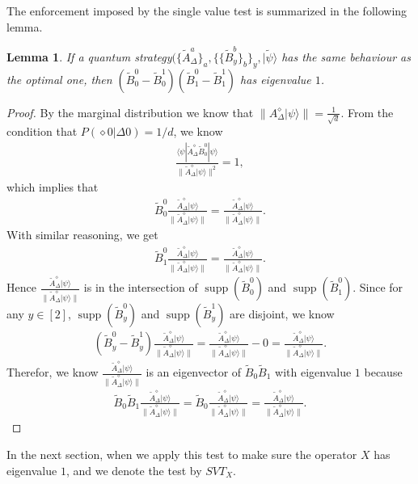 \documentclass[11pt,letterpaper]{article}
\newcommand{\ket}[1]{|#1\rangle}
\newcommand{\bra}[1]{\langle#1|}
\DeclareMathOperator{\supp}{supp}
\newcommand{\tri}{\Delta}
\newcommand{\1}{\mathbb{1}}
\newcommand{\SVT}{SVT}
\newcommand{\tA}{\tilde{A}}
\newcommand{\tB}{\tilde{B}}
\newcommand{\tpsi}{\tilde{\psi}}
\newtheorem{lemma}[theorem]{Lemma}
\theoremstyle{definition}
\begin{document}
The enforcement imposed by the single value test is summarized in the following lemma.
\begin{lemma}
	\label{lm:svt_comp}
	If a quantum strategy$(\{\tA_\tri^a\}_a, \{\{\tB_y^b\}_b\}_y, \ket{\tpsi}$ has the same behaviour as
	the optimal one, then $(\tB_0^0 - \tB_0^1)(\tB_1^0-\tB_1^1)$ has eigenvalue $1$.
\end{lemma}
\begin{proof}
By the marginal distribution we know that $\| A_\tri^\diamond \ket{\psi}\| = \frac{1}{\sqrt{d}}$.
From the condition that $P(\diamond 0|\tri 0) = 1/d$, we know
\begin{align}
	\frac{  \bra{\psi} \tA_\tri^\diamond  \tB_0^0 \ket{\psi}}{\| \tA_\tri^\diamond \ket{\psi}\|^2} = 1,
\end{align}
which implies that 
\begin{align}
 \tB_0^0 \frac{\tA_\tri^\diamond \ket{\psi}}{\| \tA_\tri^\diamond \ket{\psi}\|} = \frac{\tA_\tri^\diamond \ket{\psi}}{\| \tA_\tri^\diamond \ket{\psi}\|}.
\end{align}
With similar reasoning, we get
\begin{align}
 \tB_1^0 \frac{\tA_\tri^\diamond \ket{\psi}}{\| \tA_\tri^\diamond \ket{\psi}\|} = \frac{\tA_\tri^\diamond \ket{\psi}}{\| \tA_\tri^\diamond \ket{\psi}\|}.
\end{align}
Hence $ \frac{\tA_\tri^\diamond \ket{\psi}}{\| \tA_\tri^\diamond \ket{\psi}\|} $ is in the intersection of $\supp(\tB_0^0)$ and $\supp(\tB_1^0)$.
Since for any $y \in [2]$, $\supp(\tB_y^0)$ and $\supp(\tB_y^1)$ are disjoint, we know
\begin{align*}
	(\tB_y^0 - \tB_y^1)  \frac{\tA_\tri^\diamond \ket{\psi}}{\| \tA_\tri^\diamond \ket{\psi}\|}  =  \frac{\tA_\tri^\diamond \ket{\psi}}{\| \tA_\tri^\diamond \ket{\psi}\|} - 0 = \frac{\tA_\tri^\diamond \ket{\psi}}{\| \tA_\tri^\diamond \ket{\psi}\|}. 
\end{align*}
Therefor, we know $ \frac{\tA_\tri^\diamond \ket{\psi}}{\| \tA_\tri^\diamond \ket{\psi}\|} $ is an eigenvector of $\tB_0\tB_1$ with eigenvalue $1$ because
\begin{align}
	\tB_0\tB_1 \frac{\tA_\tri^\diamond \ket{\psi}}{\| \tA_\tri^\diamond \ket{\psi}\|} = \tB_0 \frac{\tA_\tri^\diamond \ket{\psi}}{\| \tA_\tri^\diamond \ket{\psi}\|} =  \frac{\tA_\tri^\diamond \ket{\psi}}{\| \tA_\tri^\diamond \ket{\psi}\|}.
\end{align}
\end{proof}
In the next section, when we apply this test to make sure the operator $X$ has eigenvalue $1$, and 
we denote the test by $\SVT_X$.
\end{document}

